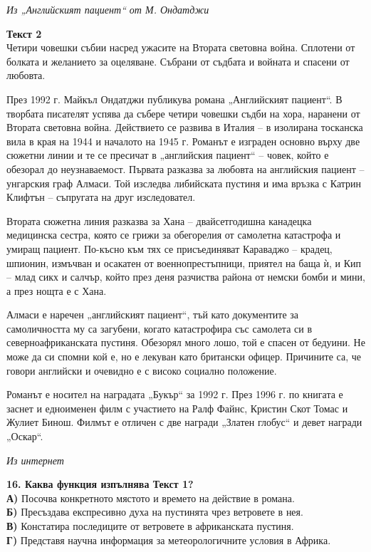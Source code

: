 \documentclass[12pt,a4paper]{article}
\begin{document}
\vspace{0.2cm}
\hfill \textit{Из „Английският пациент“ от М. Ондатджи}

\vspace{0.4cm}

\noindent
\textbf{Текст 2} \\
Четири човешки събии насред ужасите на Втората световна война. Сплотени от болката и желанието за оцеляване. Събрани от съдбата и войната и спасени от любовта.

През 1992 г. Майкъл Ондатджи публикува романа „Английският пациент“. В творбата писателят успява да събере четири човешки съдби на хора, наранени от Втората световна война. Действието се развива в Италия – в изолирана тосканска вила в края на 1944 и началото на 1945 г. Романът е изграден основно върху две сюжетни линии и те се пресичат в „английския пациент“ – човек, който е обезорал до неузнаваемост. Първата разказва за любовта на английския пациент – унгарския граф Алмаси. Той изследва либийската пустиня и има връзка с Катрин Клифтън – съпругата на друг изследовател.

Втората сюжетна линия разказва за Хана – двайсетгодишна канадецка медицинска сестра, която се грижи за обегорелия от самолетна катастрофа и умиращ пациент. По-късно към тях се присъединяват Караваджо – крадец, шпионин, измъчван и осакатен от военнопрестъпници, приятел на баща ѝ, и Кип – млад сикх и салчър, който през деня разчиства района от немски бомби и мини, а през нощта е с Хана.

Алмаси е наречен „английският пациент“, тъй като документите за самоличността му са загубени, когато катастрофира със самолета си в северноафриканската пустиня. Обезорял много лошо, той е спасен от бедуини. Не може да си спомни кой е, но е лекуван като британски офицер. Причините са, че говори английски и очевидно е с високо социално положение.

Романът е носител на наградата „Букър“ за 1992 г. През 1996 г. по книгата е заснет и едноименен филм с участието на Ралф Файнс, Кристин Скот Томас и Жулиет Бинош. Филмът е отличен с две награди „Златен глобус“ и девет награди „Оскар“.

\vspace{0.2cm}
\hfill \textit{Из интернет}

\vspace{0.6cm}

\noindent
\textbf{16. Каква функция изпълнява Текст 1?} \\
\textbf{А)} Посочва конкретното мястото и времето на действие в романа. \\
\textbf{Б)} Пресъздава експресивно духа на пустинята чрез ветровете в нея. \\
\textbf{В)} Констатира последиците от ветровете в африканската пустиня. \\
\textbf{Г)} Представя научна информация за метеорологичните условия в Африка.
\end{document}
